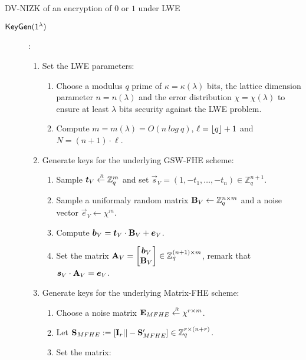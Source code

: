 


\begin{subsection}{DV-NIZK of an encryption of $0$ or $1$ under LWE}
    
    \begin{description}
    \item[${\mathsf{KeyGen}}(1^\lambda)$]:
      \begin{enumerate}
      \item Set the LWE parameters:
        \begin{enumerate}
        \item Choose a modulus $q$ prime of $\kappa = \kappa(\lambda)$ bits, the lattice dimension parameter $n = n(\lambda)$ and the error distribution $\chi = \chi(\lambda)$ to ensure at least $\lambda$ bits security against the LWE problem.
        \item Compute $m = m(\lambda) = O(n~log~q)$, $\ell = \lfloor q\rfloor+1$ and $N = (n+1) \cdot \ell$.
        \end{enumerate}
      \item Generate keys for the underlying GSW-FHE scheme:
        \begin{enumerate}
        \item Sample $\vec{t}_V \sample \mathbb{Z}_q^m$ and set $\vec{s}_V = (1, -t_1, \dots, -t_n) \in \mathbb{Z}_q^{n+1}$.
        \item Sample a uniformaly random matrix $\mathbf{B}_V \gets \mathbb{Z}_q^{n \times m}$ and a noise vector $\vec{e}_V \gets \chi^m$.
        \item Compute $\vec{b}_V = \vec{t}_V \cdot \mat{B}_V  + \vec{e}_V$.
        \item Set the matrix $\mat{A}_V = \begin{bmatrix}\vec{b}_V \\ \mat{B}_V \end{bmatrix} \in \mathbb{Z}_q^{(n+1) \times m}$, remark that $\vec{s}_V \cdot \mat{A}_V = \vec{e}_V$.
        \end{enumerate}
      \item Generate keys for the underlying Matrix-FHE scheme:
        \begin{enumerate}
        \item Choose a noise matrix $\mathbf{E}_{MFHE} \stackrel{{\scriptscriptstyle \mkern4mu R}}{\gets} \chi^{r \times m}$.
        \item Let $\mathbf{S}_{MFHE}:= [\mathbf{I}_r || - \mathbf{S}_{MFHE}'] \in \mathbb{Z}_q^{r \times (n+r)}$.
        \item Set the matrix:
          \begin{align*}

\end{align*}
\end{enumerate}
\end{enumerate}
\end{description}
\end{subsection}
